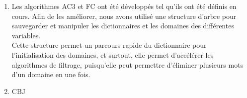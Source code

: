 \documentclass[a4paper,12pt]{report}
\begin{document}
\begin{enumerate}
\item Les algorithmes AC3 et FC ont été développés tel qu'ils ont été définis en cours. Afin de les améliorer, nous avons utilisé une structure d'arbre pour sauvegarder et manipuler les dictionnaires et les domaines des différentes variables.\\
 Cette structure permet un parcours rapide du dictionnaire pour l'initialisation des domaines, et surtout, elle permet d'accélérer les algorithmes de filtrage, puisqu'elle peut permettre d'éliminer plusieurs mots d'un domaine en une fois.\\

\item CBJ


\end{enumerate}
\end{document}
